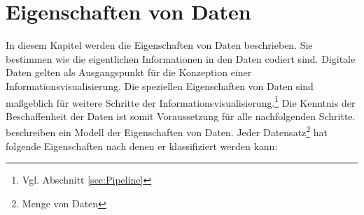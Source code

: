 \documentclass[a4paper, 12pt, DIVcalc, onepage, pdftex, headsepline, footsepline]{scrreprt}
\begin{document}
\section{Eigenschaften von Daten}
\label{sec:EigenschaftenDaten}
In diesem Kapitel werden die Eigenschaften von Daten beschrieben. Sie bestimmen wie die eigentlichen Informationen
in den Daten codiert sind.
Digitale Daten gelten als Ausgangspunkt für die Konzeption einer Informationsvisualisierung. Die speziellen
Eigenschaften von Daten sind maßgeblich für weitere Schritte der Informationsvisualisierung.\footnote{Vgl. 
Abschnitt \ref{sec:Pipeline}}
Die Kenntnis der Beschaffenheit der Daten ist somit Voraussetzung für alle nachfolgenden Schritte.
\citep{Schumann} beschreiben ein Modell der Eigenschaften von Daten. Jeder Datensatz\footnote{Menge von Daten}
hat folgende Eigenschaften nach denen er klassifiziert werden kann:
\end{document}
